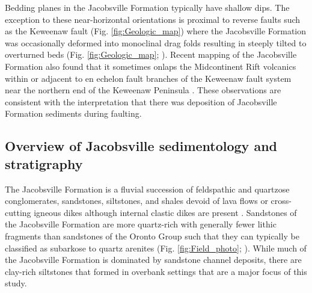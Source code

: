 \documentclass[draft]{agujournal2019}
\begin{document}
Bedding planes in the Jacobsville Formation typically have shallow dips. The exception to these near-horizontal orientations is proximal to reverse faults such as the Keweenaw fault (Fig. \ref{fig:Geologic_map}) where the Jacobsville Formation was occasionally deformed into monoclinal drag folds resulting in steeply tilted to overturned beds (Fig. \ref{fig:Geologic_map}; ). Recent mapping of the Jacobsville Formation also found that it sometimes onlaps the Midcontinent Rift volcanics within or adjacent to en echelon fault branches of the Keweenaw fault system near the northern end of the Keweenaw Peninsula \cite{Tyrrell2019a, Mueller2021a}. These observations are consistent with the interpretation that there was deposition of Jacobsville Formation sediments during faulting.

\subsection*{Overview of Jacobsville sedimentology and stratigraphy}

The Jacobsville Formation is a fluvial succession of feldspathic and quartzose conglomerates, sandstones, siltstones, and shales devoid of lava flows or cross-cutting igneous dikes although internal clastic dikes are present \cite{Hamblin1958a}. Sandstones of the Jacobsville Formation are more quartz-rich with generally fewer lithic fragments than sandstones of the Oronto Group such that they can typically be classified as subarkose to quartz arenites (Fig. \ref{fig:Field_photo}; ). While much of the Jacobsville Formation is dominated by sandstone channel deposits, there are clay-rich siltstones that formed in overbank settings that are a major focus of this study.
\end{document}
